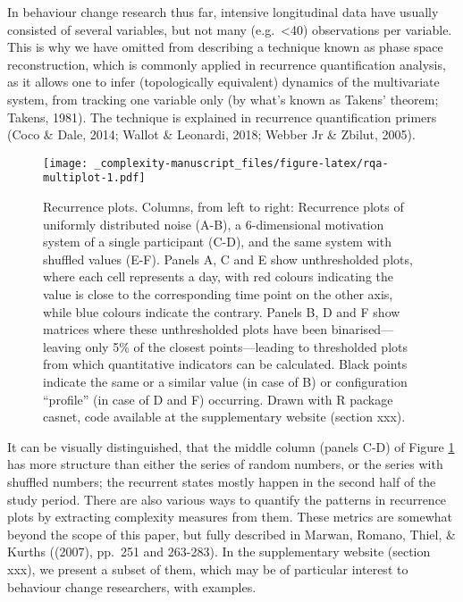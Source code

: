 \documentclass[
  british,
  man,floatsintext]{apa6}
\begin{document}
In behaviour change research thus far, intensive longitudinal data have usually consisted of several variables, but not many (e.g.~\textless40) observations per variable. This is why we have omitted from describing a technique known as phase space reconstruction, which is commonly applied in recurrence quantification analysis, as it allows one to infer (topologically equivalent) dynamics of the multivariate system, from tracking one variable only (by what's known as Takens' theorem; Takens, 1981). The technique is explained in recurrence quantification primers (Coco \& Dale, 2014; Wallot \& Leonardi, 2018; Webber Jr \& Zbilut, 2005).

\begin{figure}
\centering
\texttt{[image: \_complexity-manuscript\_files/figure-latex/rqa-multiplot-1.pdf]}
\caption{\label{fig:rqa-multiplot}Recurrence plots. Columns, from left to right: Recurrence plots of uniformly distributed noise (A-B), a 6-dimensional motivation system of a single participant (C-D), and the same system with shuffled values (E-F). Panels A, C and E show unthresholded plots, where each cell represents a day, with red colours indicating the value is close to the corresponding time point on the other axis, while blue colours indicate the contrary. Panels B, D and F show matrices where these unthresholded plots have been binarised---leaving only 5\% of the closest points---leading to thresholded plots from which quantitative indicators can be calculated. Black points indicate the same or a similar value (in case of B) or configuration \enquote{profile} (in case of D and F) occurring. Drawn with R package casnet, code available at the supplementary website (section xxx).}
\end{figure}

It can be visually distinguished, that the middle column (panels C-D) of Figure \ref{fig:rqa-multiplot} has more structure than either the series of random numbers, or the series with shuffled numbers; the recurrent states mostly happen in the second half of the study period. There are also various ways to quantify the patterns in recurrence plots by extracting complexity measures from them. These metrics are somewhat beyond the scope of this paper, but fully described in Marwan, Romano, Thiel, \& Kurths ((2007), pp.~251 and 263-283). In the supplementary website (section xxx), we present a subset of them, which may be of particular interest to behaviour change researchers, with examples.
\end{document}
